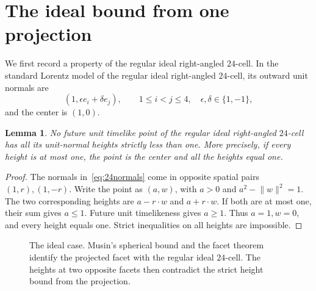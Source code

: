 \documentclass[11pt]{article}
\newtheorem{lemma}[theorem]{Lemma}
\theoremstyle{remark}
\newcommand{\norm}[1]{\lVert #1\rVert}
\newcommand{\CELL}{\mathcal C}
\begin{document}
\section{The ideal bound from one projection}\label{sec:ideal}

We first record a property of the regular ideal right-angled $24$-cell.
In the standard Lorentz model of the regular ideal right-angled
$24$-cell, its outward unit normals are
\begin{equation}\label{eq:24normals}
 (1,\epsilon e_i+\delta e_j),\qquad
 1\le i<j\le4,\quad\epsilon,\delta\in\{1,-1\},
\end{equation}
and the center is $(1,0)$.

\begin{lemma}\label{lem:center}
No future unit timelike point of the regular ideal right-angled
$24$-cell has all its unit-normal heights strictly less than one.
More precisely, if every height is at most one, the point is the
center and all the heights equal one.
\end{lemma}
\begin{proof}
The normals in~\eqref{eq:24normals} come in opposite spatial pairs
$(1,r),(1,-r)$. Write the point as $(a,w)$, with $a>0$ and
$a^2-\norm w^2=1$. The two corresponding heights are
$a-r\cdot w$ and $a+r\cdot w$. If both are at most one, their
sum gives $a\le1$. Future unit timelikeness gives $a\ge1$.
Thus $a=1,w=0$, and every height equals one. Strict inequalities
on all heights are impossible.
\end{proof}

\begin{figure}[htbp]
\centering
{}
\caption{The ideal case. Musin's spherical bound and the facet
theorem~\cite[Theorem~4]{Kolpakov} identify the projected facet with the regular ideal
$24$-cell. The heights at two opposite facets then contradict
the strict height bound from the projection.}
\label{fig:idealbranch}
\end{figure}
\end{document}
